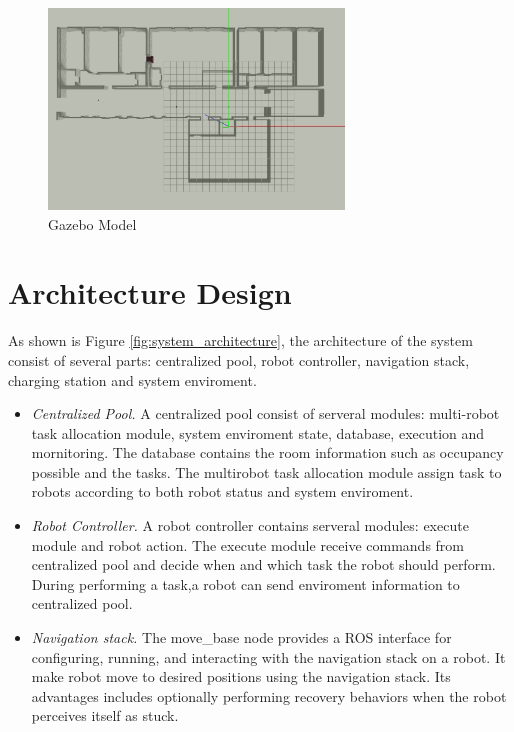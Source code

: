 \begin{figure}[htbp]
	\centering
	\includegraphics[width = 0.7\textwidth]{content/images/ch3/gazebo_model.png}
	\caption{Gazebo Model}
	\label{fig:gazebo_model}
\end{figure}

\section{Architecture Design}

As shown is Figure \ref{fig:system_architecture}, the architecture of the system consist of several parts: centralized pool, robot controller, navigation stack, charging station and system enviroment. 
\begin{itemize}
	\item \textsl{Centralized Pool.} A centralized pool consist of serveral modules: multi-robot task allocation module, system enviroment state, database, execution and mornitoring. The database contains the room information such as occupancy possible and the tasks. The multirobot task allocation module assign task to robots according to both robot status and system enviroment.
	\item \textsl{Robot Controller.} A robot controller contains serveral modules: execute module and robot action. The execute module receive commands from centralized pool and decide when and which task the robot should perform. During performing a task,a robot can send enviroment information to centralized pool.
	\item \textsl{Navigation stack.} The move\_base node provides a ROS interface for configuring, running, and interacting with the navigation stack on a robot. It make robot move to desired positions using the navigation stack. Its advantages includes optionally performing recovery behaviors when the robot perceives itself as stuck. 
\end{itemize} 

